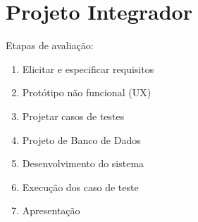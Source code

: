 \documentclass[ ]{article}
\begin{document}
	\section{Projeto Integrador}
		Etapas de avaliação:
		\begin{enumerate}
			\item Elicitar e especificar requisitos
			\item Protótipo não funcional (UX)
			\item Projetar casos de testes
			\item Projeto de Banco de Dados
			\item Desenvolvimento do sistema
			\item Execução dos caso de teste
			\item Apresentação
		\end{enumerate}
\end{document}

